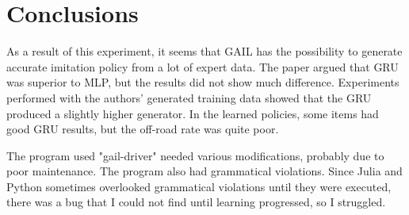 \chapter{Conclusions}
\label{chapter:conclusions}

As a result of this experiment, it seems that GAIL has the possibility to generate accurate imitation policy from a lot of expert data. The paper argued that GRU was superior to MLP, but the results did not show much difference.
Experiments performed with the authors' generated training data showed that the GRU produced a slightly higher generator. In the learned policies, some items had good GRU results, but the off-road rate was quite poor.


The program used "gail-driver" needed various modifications, probably due to poor maintenance. The program also had grammatical violations. Since Julia and Python sometimes overlooked grammatical violations until they were executed, there was a bug that I could not find until learning progressed, so I struggled.